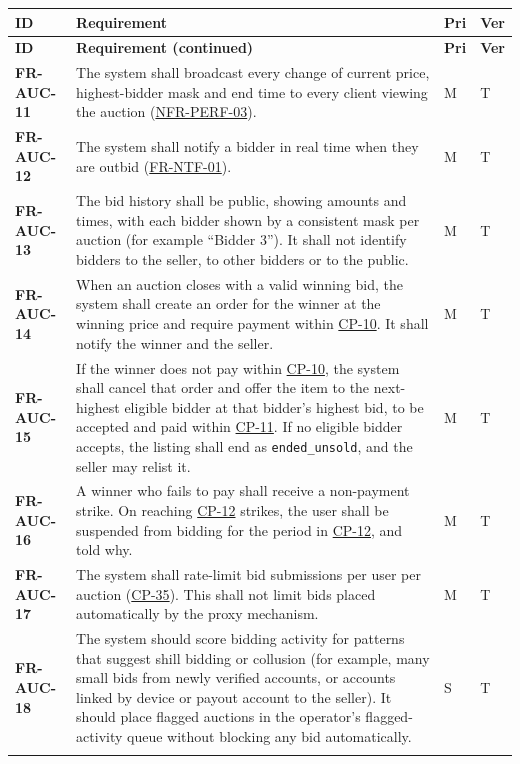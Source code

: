 \documentclass[11pt,a4paper]{report}
\makeatletter
\newenvironment{reqs}{%
  \small
  \begin{longtable}{@{}>{\raggedright\arraybackslash}p{2.35cm}
                       >{\raggedright\arraybackslash}p{10.3cm}
                       >{\centering\arraybackslash}p{0.7cm}
                       >{\centering\arraybackslash}p{0.7cm}@{}}
  \toprule
  \textbf{ID} & \textbf{Requirement} & \textbf{Pri} & \textbf{Ver} \\
  \midrule
  \endfirsthead
  \toprule
  \textbf{ID} & \textbf{Requirement (continued)} & \textbf{Pri} & \textbf{Ver} \\
  \midrule
  \endhead
  \bottomrule
  \endfoot
}{\end{longtable}}
\newcommand{\req}[5]{\leavevmode\textbf{#1}\hypertarget{#1}{} & #5 & #2 & #3 \\ \addlinespace[2pt]}
\newcommand{\rr}[1]{\hyperlink{#1}{#1}}
\newcommand{\cp}[1]{\hyperlink{#1}{#1}}
\makeatother
\begin{document}
\begin{reqs}
\req{FR-AUC-11}{M}{T}{FR-31}{The system shall broadcast every change of current price, highest-bidder mask and end time to every client viewing the auction (\rr{NFR-PERF-03}).}
\req{FR-AUC-12}{M}{T}{FR-32}{The system shall notify a bidder in real time when they are outbid (\rr{FR-NTF-01}).}
\req{FR-AUC-13}{M}{T}{new}{The bid history shall be public, showing amounts and times, with each bidder shown by a consistent mask per auction (for example ``Bidder 3''). It shall not identify bidders to the seller, to other bidders or to the public.}
\req{FR-AUC-14}{M}{T}{FR-33}{When an auction closes with a valid winning bid, the system shall create an order for the winner at the winning price and require payment within \cp{CP-10}. It shall notify the winner and the seller.}
\req{FR-AUC-15}{M}{T}{FR-34}{If the winner does not pay within \cp{CP-10}, the system shall cancel that order and offer the item to the next-highest eligible bidder at that bidder's highest bid, to be accepted and paid within \cp{CP-11}. If no eligible bidder accepts, the listing shall end as \texttt{ended\_unsold}, and the seller may relist it.}
\req{FR-AUC-16}{M}{T}{new}{A winner who fails to pay shall receive a non-payment strike. On reaching \cp{CP-12} strikes, the user shall be suspended from bidding for the period in \cp{CP-12}, and told why.}
\req{FR-AUC-17}{M}{T}{FR-88}{The system shall rate-limit bid submissions per user per auction (\cp{CP-35}). This shall not limit bids placed automatically by the proxy mechanism.}
\req{FR-AUC-18}{S}{T}{proposal AI}{The system should score bidding activity for patterns that suggest shill bidding or collusion (for example, many small bids from newly verified accounts, or accounts linked by device or payout account to the seller). It should place flagged auctions in the operator's flagged-activity queue without blocking any bid automatically.}
\end{reqs}
\end{document}
